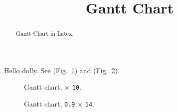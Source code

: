 \documentclass[twocolumn]{article}
\title{Gantt Chart}
\begin{document}
\maketitle
\begin{abstract}
  Gantt Chart in Latex.
\end{abstract}

Hello dolly.  See (Fig.~\ref{fig:gantt}) and (Fig.~\ref{fig:gantt-wide}).
\begin{figure}[h]\centering
{}
\caption{Gantt chart, \texttt{\string\linewidth} $\times$ \texttt{10\string\baselineskip}.}
\label{fig:gantt}
\end{figure}

\begin{figure}[t]\centering
{}
\caption{Gantt chart, \texttt{0.9\string\textwidth} $\times$ \texttt{14\string\baselineskip}.}
\label{fig:gantt-wide}
\end{figure}
\end{document}
